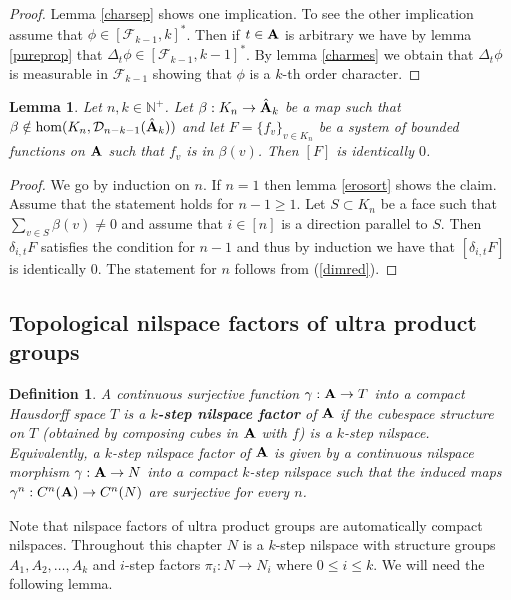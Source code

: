 \documentclass [11pt] {article}
\newtheorem{lemma}{Lemma}[section]
\newtheorem{definition}{Definition}[section]
\def\bA{{\bf A}}
\begin{document}
\begin{proof} Lemma \ref{charsep} shows one implication. To see the other implication assume that $\phi\in[\mathcal{F}_{k-1},k]^*$. Then if $t\in\bA$ is arbitrary we have by lemma \ref{pureprop} that $\Delta_t\phi\in [\mathcal{F}_{k-1},k-1]^*$. By lemma \ref{charmes} we obtain that $\Delta_t\phi$ is measurable in $\mathcal{F}_{k-1}$ showing that $\phi$ is a $k$-th order character.
\end{proof}


\begin{lemma}\label{charconv} Let $n,k\in\mathbb{N}^+$. Let $\beta:K_n\rightarrow\hat{\bA}_k$ be a map such that $\beta\notin\hom(K_n,\mathcal{D}_{n-k-1}(\hat{\bA}_k))$ and let $F=\{f_v\}_{v\in K_n}$ be a system of bounded functions on $\bA$ such that $f_v$ is in $\beta(v)$. Then $[F]$ is identically $0$.
\end{lemma} 

\begin{proof} We go by induction on $n$. If $n=1$ then lemma \ref{erosort} shows the claim. Assume that the statement holds for $n-1\geq 1$.
Let $S\subset K_n$ be a face such that $\sum_{v\in S}\beta(v)\neq 0$ and assume that $i\in [n]$ is a direction parallel to $S$. Then $\delta_{i,t} F$ satisfies the condition for $n-1$ and thus by induction we have that $[\delta_{i,t} F]$ is identically $0$. The statement for $n$ follows from (\ref{dimred}). 
\end{proof}


\subsection{Topological nilspace factors of ultra product groups}

\bigskip

\begin{definition} A continuous surjective function $\gamma:\bA\rightarrow T$ into a compact Hausdorff space $T$ is a {\bf $k$-step nilspace factor} of $\bA$ if the cubespace structure on $T$ (obtained by composing cubes in $\bA$ with $f$) is a $k$-step nilspace. Equivalently, a $k$-step nilspace factor of $\bA$ is given by a continuous nilspace morphism $\gamma:\bA\rightarrow N$ into a compact $k$-step nilspace such that the induced maps $\gamma^n:C^n(\bA)\rightarrow C^n(N)$ are surjective for every $n$. 
\end{definition}

Note that nilspace factors of ultra product groups are automatically compact nilspaces.
Throughout this chapter $N$ is a $k$-step nilspace with structure groups $A_1,A_2,\dots,A_k$ and $i$-step factors $\pi_i:N\rightarrow N_i$ where $0\leq i\leq k$.
We will need the following lemma.
\end{document}
